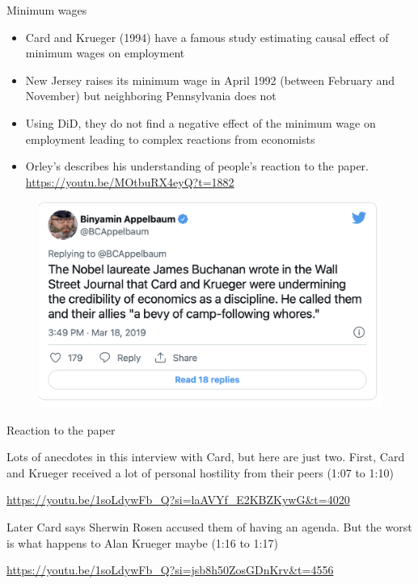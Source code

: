 \documentclass{beamer}
\begin{document}
\begin{frame}{Minimum wages}

\begin{itemize}
\item Card and Krueger (1994) have a famous study estimating causal effect of minimum wages on employment
\item  New Jersey raises its minimum wage in April 1992 (between February and November) but neighboring Pennsylvania does not
\item Using DiD, they do not find a negative effect of the minimum wage on employment leading to complex reactions from economists
\item Orley's describes his understanding of people's reaction to the paper.  \\ \url{https://youtu.be/MOtbuRX4eyQ?t=1882}
\end{itemize}

\end{frame}

\begin{frame}
	\begin{figure}
	\includegraphics[scale=0.5]{./lecture_includes/minwage_whore}
	\end{figure}
\end{frame}


\begin{frame}{Reaction to the paper}


Lots of anecdotes in this interview with Card, but here are just two.  First, Card and Krueger received a lot of personal hostility from their peers (1:07 to 1:10)

\bigskip

\url{https://youtu.be/1soLdywFb_Q?si=laAVYf_E2KBZKywG&t=4020}

\bigskip

Later Card says Sherwin Rosen accused them of having an agenda.  But the worst is what happens to Alan Krueger maybe (1:16 to 1:17)

\bigskip

\url{https://youtu.be/1soLdywFb_Q?si=jsb8h50ZosGDnKrv&t=4556}




\end{frame}
\end{document}
